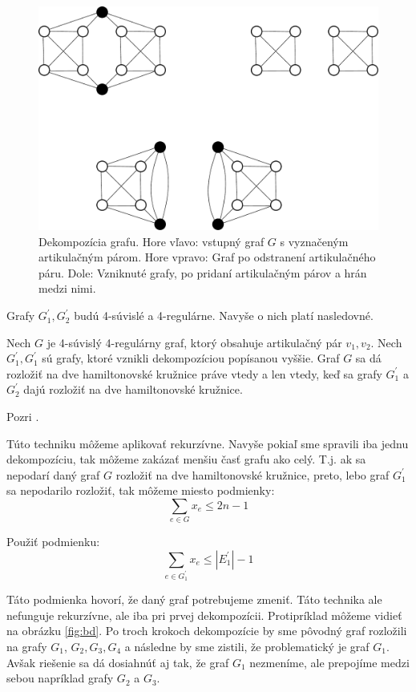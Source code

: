 \begin{figure}
\centering
\includegraphics[width=15cm]{img/decomp.pdf}
\caption{Dekompozícia grafu. Hore vľavo: vstupný graf $G$ s vyznačeným artikulačným párom. Hore
vpravo: Graf po odstranení artikulačného páru. Dole: Vzniknuté grafy, po pridaní artikulačným párov
a hrán medzi nimi.}
\end{figure}

Grafy $G_1^{'}, G_2^{'}$ budú 4-súvislé a 4-regulárne. Navyše o nich platí nasledovné.

\begin{veta}
Nech $G$ je 4-súvislý 4-regulárny graf, ktorý obsahuje artikulačný pár $v_1, v_2$.
Nech $G_1^{'}, G_1^{'}$ sú grafy, ktoré vznikli dekompozíciou popísanou vyššie.
Graf $G$ sa dá rozložiť na dve hamiltonovské kružnice práve vtedy a len vtedy, keď
sa grafy $G_1^{'}$ a $G_2^{'}$ dajú rozložiť na dve hamiltonovské kružnice.
\end{veta}

\begin{dokaz}
Pozri \cite{duchenne}.
\end{dokaz}

Túto techniku môžeme aplikovať rekurzívne. Navyše pokiaľ sme spravili iba jednu dekompozíciu, tak
môžeme zakázať menšiu časť grafu ako celý. T.j. ak sa nepodarí daný graf $G$ rozložiť na dve
hamiltonovské kružnice, preto, lebo graf $G_1^{'}$ sa nepodarilo rozložiť, tak môžeme miesto podmienky:
$$\sum_{e \in G} x_e \leq 2n - 1$$

Použiť podmienku:
$$\sum_{e \in G_1^{'}} x_e \leq |E_1^{'}| - 1$$

Táto podmienka hovorí, že daný graf potrebujeme zmeniť.
Táto technika ale nefunguje rekurzívne, ale iba pri prvej dekompozícii. Protipríklad môžeme vidieť
na obrázku \ref{fig:bd}. Po troch krokoch dekompozície by sme pôvodný graf rozložili
na grafy $G_1$, $G_2, G_3, G_4$ a následne by sme zistili, že problematický je graf $G_1$.
Avšak riešenie sa dá dosiahnúť aj tak, že graf $G_1$ nezmeníme, ale prepojíme medzi sebou napríklad
grafy $G_2$ a $G_3$.

